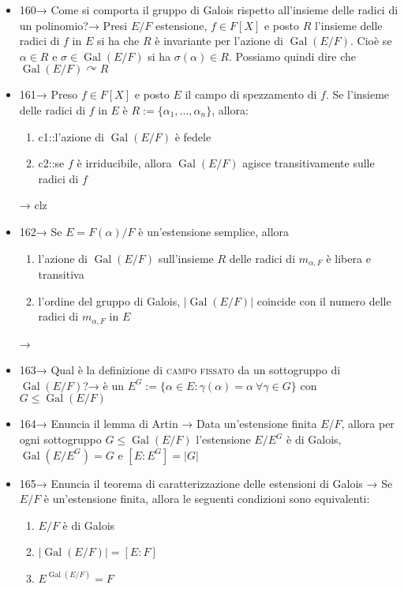 \documentclass[A4,12pt]{article}
\newcommand{\acts}{\curvearrowright}
\begin{document}
\begin{itemize}[noitemsep]
		\item 160→ Come si comporta il gruppo di Galois rispetto all'insieme delle radici di un polinomio?→ Presi $ E/F $ estensione, $f \in  F[X] $ e posto $ R $ l'insieme delle radici di  $ f $ in $ E $ si ha che $ R $ è invariante per l'azione di $ \operatorname{Gal}(E/F) $. Cioè se $ \alpha \in R $ e $ \sigma \in \operatorname{Gal}(E/F) $ si ha $ \sigma(\alpha)\in R $. Possiamo quindi dire che $ \operatorname{Gal}(E/F)\acts R $
		\item 161→ Preso $ f\in F[X] $ e posto $ E $ il campo di spezzamento di $ f $. Se l'insieme delle radici di $ f $ in $ E $ è $ R:= \{\alpha_1,...,\alpha_n\} $, allora: \begin{enumerate}
			\item {{c1::l'azione di $ \operatorname{Gal}(E/F) $ è fedele}}
			\item {{c2::se $ f $ è irriducibile, allora $ \operatorname{Gal}(E/F) $ agisce transitivamente sulle radici di $ f $}}
		\end{enumerate} → clz
		\item 162→ Se $ E=F(\alpha)/F $ è un'estensione semplice, allora \begin{enumerate}
			\item l'azione di $ \operatorname{Gal}(E/F) $ sull'insieme $ R $ delle radici di $ m_{\alpha,F} $ è libera e transitiva
			\item l'ordine del gruppo di Galois, $ |\operatorname{Gal}(E/F) |$ coincide con il numero delle radici di $ m_{\alpha,F} $ in $ E $
		\end{enumerate} →
		\item 163→ Qual è la definizione di \textsc{campo fissato}  da un sottogruppo di $ \operatorname{Gal}(E/F) $?→ è un $ E^G:=\{\alpha\in E:\gamma(\alpha) =\alpha \ \forall \gamma \in G\} $ con $ G\leq \operatorname{Gal}(E/F) $
		\item 164→ Enuncia il lemma di Artin → Data un'estensione finita $ E/F $, allora per ogni sottogruppo $ G\leq \operatorname{Gal}(E/F) $ l'estensione $ E/E^G $ è di Galois, $ \operatorname{Gal}(E/E^G)=G $ e $ [E:E^G] = |G| $
		\item 165→ Enuncia il teorema di caratterizzazione delle estensioni di Galois → Se $ E/F $ è un'estensione finita, allora le seguenti condizioni sono equivalenti: \begin{enumerate}
			\item $ E/F $ è di Galois
			\item $ |\operatorname{Gal}(E/F)|=[E:F] $
			\item $ E^{\operatorname{Gal}(E/F)}=F $

\end{enumerate}
\end{itemize}
\end{document}
